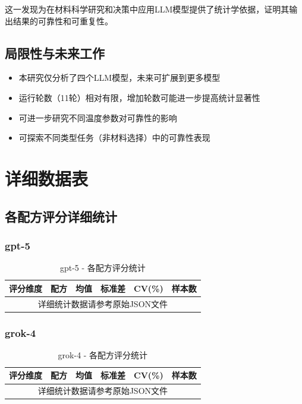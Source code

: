 \documentclass[12pt,a4paper]{article}
\begin{document}
这一发现为在材料科学研究和决策中应用LLM模型提供了统计学依据，证明其输出结果的可靠性和可重复性。

\subsection{局限性与未来工作}

\begin{itemize}
    \item 本研究仅分析了四个LLM模型，未来可扩展到更多模型
    \item 运行轮数（11轮）相对有限，增加轮数可能进一步提高统计显著性
    \item 可进一步研究不同温度参数对可靠性的影响
    \item 可探索不同类型任务（非材料选择）中的可靠性表现
\end{itemize}

\newpage


\appendix

\section{详细数据表}

\subsection{各配方评分详细统计}

\subsubsection{gpt-5}

\begin{table}[H]
\centering
\caption{gpt-5 - 各配方评分统计}
\small
\begin{tabular}{llcccc}
\toprule
\textbf{评分维度} & \textbf{配方} & \textbf{均值} & \textbf{标准差} & \textbf{CV(\%)} & \textbf{样本数} \\
\midrule
\multicolumn{6}{c}{详细统计数据请参考原始JSON文件} \\
\bottomrule
\end{tabular}
\end{table}

\subsubsection{grok-4}

\begin{table}[H]
\centering
\caption{grok-4 - 各配方评分统计}
\small
\begin{tabular}{llcccc}
\toprule
\textbf{评分维度} & \textbf{配方} & \textbf{均值} & \textbf{标准差} & \textbf{CV(\%)} & \textbf{样本数} \\
\midrule
\multicolumn{6}{c}{详细统计数据请参考原始JSON文件} \\
\bottomrule
\end{tabular}
\end{table}
\end{document}
